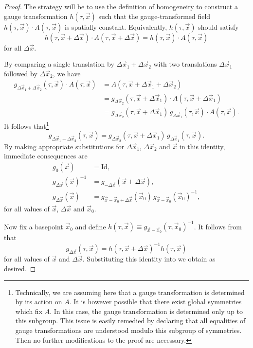\begin{proof}
The strategy will be to use the definition of homogeneity to construct a gauge transformation $h(\tau,\vec{x})$ such that the gauge-transformed field $h(\tau,\vec{x})\cdot A(\tau,\vec{x})$ is spatially constant. Equivalently, $h(\tau,\vec{x})$ should satisfy 
\begin{equation}
h(\tau,\vec{x}+\Delta\vec{x})\cdot A(\tau,\vec{x}+\Delta\vec{x})=h(\tau,\vec{x})\cdot A(\tau,\vec{x})\label{eq:const-gf}
\end{equation}
 for all $\Delta\vec{x}$. 

By comparing a single translation by $\Delta\vec{x}_{1}+\Delta\vec{x}_{2}$ with two translations $\Delta\vec{x}_{1}$ followed by $\Delta\vec{x}_{2}$, we have 
\begin{align*}
g_{\Delta\vec{x}_{1}+\Delta\vec{x}_{2}}(\tau,\vec{x})\cdot A(\tau,\vec{x}) & =A(\tau,\vec{x}+\Delta\vec{x}_{1}+\Delta\vec{x}_{2})\\
 & =g_{\Delta\vec{x}_{2}}(\tau,\vec{x}+\Delta\vec{x}_{1})\cdot A(\tau,\vec{x}+\Delta\vec{x}_{1})\\
 & =g_{\Delta\vec{x}_{2}}(\tau,\vec{x}+\Delta\vec{x}_{1})\,g_{\Delta\vec{x}_{1}}(\tau,\vec{x})\cdot A(\tau,\vec{x}).
\end{align*}
 It follows that\footnote{Technically, we are assuming here that a gauge transformation is determined by its action on $A$. It is however possible that there exist global symmetries which fix $A$. In this case, the gauge transformation is determined only up to this subgroup. This issue is easily remedied by declaring that all equalities of gauge transformations are understood modulo this subgroup of symmetries. Then no further modifications to the proof are necessary.} 
\[
g_{\Delta\vec{x}_{1}+\Delta\vec{x}_{2}}(\tau,\vec{x})=g_{\Delta\vec{x}_{2}}(\tau,\vec{x}+\Delta\vec{x}_{1})\,g_{\Delta\vec{x}_{1}}(\tau,\vec{x}).
\]
 By making appropriate substitutions for $\Delta\vec{x}_{1}$, $\Delta\vec{x}_{2}$ and $\vec{x}$ in this identity, immediate consequences are 
\begin{align}
g_{0}(\vec{x}) & =\mathrm{Id},\nonumber \\
g_{\Delta\vec{x}}(\vec{x})^{-1} & =g_{-\Delta\vec{x}}(\vec{x}+\Delta\vec{x}),\nonumber \\
g_{\Delta\vec{x}}(\vec{x}) & =g_{\vec{x}-\vec{x}_{0}+\Delta\vec{x}}(\vec{x}_{0})\,g_{\vec{x}-\vec{x}_{0}}(\vec{x}_{0})^{-1},\label{eq:gauge-id3}
\end{align}
 for all values of $\vec{x}$, $\Delta\vec{x}$ and $\vec{x}_{0}$. 

Now fix a basepoint $\vec{x}_{0}$ and define $h(\tau,\vec{x})\equiv g_{\vec{x}-\vec{x}_{0}}(\tau,\vec{x}_{0})^{-1}$. It follows from  that 
\[
g_{\Delta\vec{x}}(\tau,\vec{x})=h(\tau,\vec{x}+\Delta\vec{x})^{-1}h(\tau,\vec{x})
\]
 for all values of $\vec{x}$ and $\Delta\vec{x}$. Substituting this identity into  we obtain  as desired.
\end{proof}
